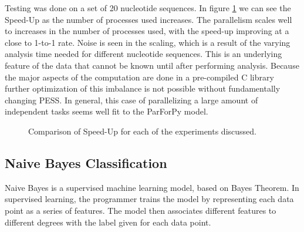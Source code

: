 \documentclass[conference]{IEEEtran}
\begin{document}
Testing was done on a set of 20 nucleotide sequences.
In figure \ref{SpeedUpResults} we can see the Speed-Up as the number of processes
used increases.
The parallelism scales well to increases in the number of processes used, with
the speed-up improving at a close to 1-to-1 rate.
Noise is seen in the scaling, which is a result of the varying analysis time
needed for different nucleotide sequences. 
This is an underlying feature of the data that cannot be known until after performing 
analysis.
Because the major aspects of the computation are done in a pre-compiled C library further
optimization of this imbalance is not possible without fundamentally changing PESS.
In general, this case of parallelizing a large amount of independent tasks seems well fit to the ParForPy model.

\begin{figure}[t]
\centering
{}
\caption{Comparison of Speed-Up for each of the experiments discussed.}
\label{SpeedUpResults}
\end{figure}


\subsection{Naive Bayes Classification}

Naive Bayes is a supervised machine learning model, based on Bayes Theorem. 
In supervised learning,
the programmer trains the model by representing each data point as a series of features.
The model then associates different features to different degrees with the label given for 
each data point.
\end{document}
